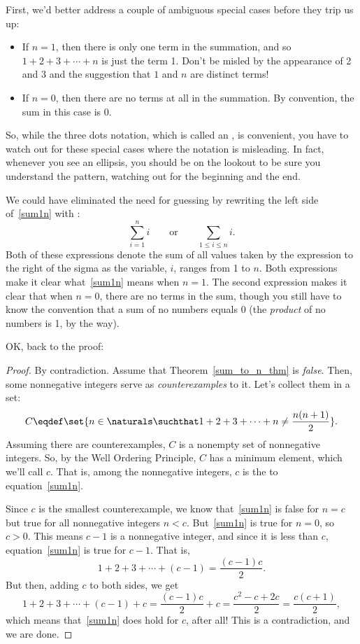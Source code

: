 First, we'd better address a couple of ambiguous special
cases before they trip us up:
\begin{itemize}
\item If $n = 1$, then there is only one term in the summation, and so $1
  + 2 + 3 + \cdots + n$ is just the term 1.  Don't be misled by the
  appearance of 2 and 3 and the suggestion that $1$ and $n$ are distinct
  terms!
\item If $n = 0$, then there are no terms at all in the summation.  By
convention, the sum in this case is 0.
\end{itemize}
So, while the three dots notation, which is called an ,
is convenient, you have to watch out for these special cases where the
notation is misleading.  In fact, whenever you see an ellipsis, you
should be on the lookout to be sure you understand the pattern,
watching out for the beginning and the end.

We could have eliminated the need for guessing by rewriting the left side
of~\eqref{sum1n} with :
\[
\sum_{i=1}^n i
\qquad \text{or} \qquad
\sum_{1 \leq i \leq n} i.
\]
Both of these expressions denote the sum of all values taken by the
expression to the right of the sigma as the variable, $i$, ranges from
1 to $n$.  Both expressions make it clear what~\eqref{sum1n} means
when $n=1$.  The second expression makes it clear that when $n=0$,
there are no terms in the sum, though you still have to know the
convention that a sum of no numbers equals 0 (the \emph{product} of no
numbers is 1, by the way).

OK, back to the proof:
\begin{proof}
By contradiction.  Assume that Theorem~\ref{sum_to_n_thm} is
\emph{false}.  Then, some nonnegative integers serve as
\emph{counterexamples} to it. Let's collect them in a set:
\[
C \eqdef \set{n\in\naturals \suchthat 
        1 + 2 + 3 + \cdots + n \neq \frac{n(n+1)}{2}}.
\]
Assuming there are counterexamples, $C$ is a nonempty set of
nonnegative integers.  So, by the Well Ordering Principle, $C$ has a
minimum element, which we'll call $c$.  That is, among the nonnegative
integers, $c$ is the \emph{} to
equation~\eqref{sum1n}.

Since $c$ is the smallest counterexample, we know that~\eqref{sum1n} is
false for $n=c$ but true for all nonnegative integers $n<c$.
But~\eqref{sum1n} is true for $n=0$, so $c > 0$.  This means $c-1$ is a
nonnegative integer, and since it is less than $c$, equation~\eqref{sum1n}
is true for $c-1$.  That is,
\[
        1 + 2 + 3 + \cdots + (c-1) = \frac{(c-1)c}{2}.
\]
But then, adding $c$ to both sides, we get
\[
1 + 2 + 3 + \cdots + (c-1) + c 
        = \frac{(c-1)c}{2} + c
        = \frac{c^2 - c + 2c}{2} 
        = \frac{c(c+1)}{2},
\]
which means that~\eqref{sum1n} does hold for $c$, after all!  This is a
contradiction, and we are done.
\end{proof}


